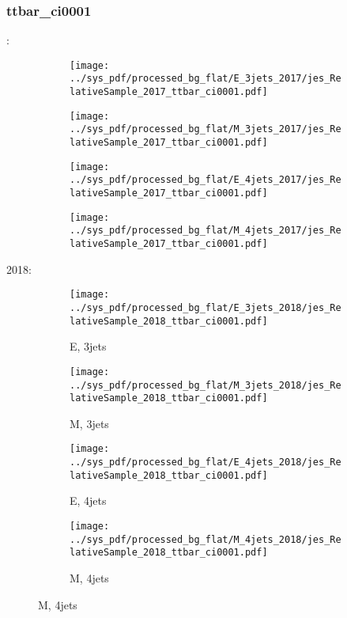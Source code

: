 \documentclass{beamer}
\begin{document}
\begin{frame}
\frametitle{ttbar_ci0001}
\fontsize{5}{1}:
\begin{figure}
\centering
\begin{subfigure}[b]{0.24\textwidth}
\texttt{[image: ../sys\_pdf/processed\_bg\_flat/E\_3jets\_2017/jes\_RelativeSample\_2017\_ttbar\_ci0001.pdf]}
\end{subfigure}
\begin{subfigure}[b]{0.24\textwidth}
\texttt{[image: ../sys\_pdf/processed\_bg\_flat/M\_3jets\_2017/jes\_RelativeSample\_2017\_ttbar\_ci0001.pdf]}
\end{subfigure}
\begin{subfigure}[b]{0.24\textwidth}
\texttt{[image: ../sys\_pdf/processed\_bg\_flat/E\_4jets\_2017/jes\_RelativeSample\_2017\_ttbar\_ci0001.pdf]}
\end{subfigure}
\begin{subfigure}[b]{0.24\textwidth}
\texttt{[image: ../sys\_pdf/processed\_bg\_flat/M\_4jets\_2017/jes\_RelativeSample\_2017\_ttbar\_ci0001.pdf]}
\end{subfigure}
\end{figure}
2018:
\begin{figure}
\centering
\begin{subfigure}[b]{0.24\textwidth}
\texttt{[image: ../sys\_pdf/processed\_bg\_flat/E\_3jets\_2018/jes\_RelativeSample\_2018\_ttbar\_ci0001.pdf]}
\captionsetup{font=tiny}
\caption{E, 3jets}
\end{subfigure}
\begin{subfigure}[b]{0.24\textwidth}
\texttt{[image: ../sys\_pdf/processed\_bg\_flat/M\_3jets\_2018/jes\_RelativeSample\_2018\_ttbar\_ci0001.pdf]}
\captionsetup{font=tiny}
\caption{M, 3jets}
\end{subfigure}
\begin{subfigure}[b]{0.24\textwidth}
\texttt{[image: ../sys\_pdf/processed\_bg\_flat/E\_4jets\_2018/jes\_RelativeSample\_2018\_ttbar\_ci0001.pdf]}
\captionsetup{font=tiny}
\caption{E, 4jets}
\end{subfigure}
\begin{subfigure}[b]{0.24\textwidth}
\texttt{[image: ../sys\_pdf/processed\_bg\_flat/M\_4jets\_2018/jes\_RelativeSample\_2018\_ttbar\_ci0001.pdf]}
\captionsetup{font=tiny}
\caption{M, 4jets}
\end{subfigure}
\end{figure}
\end{frame}
\end{document}
